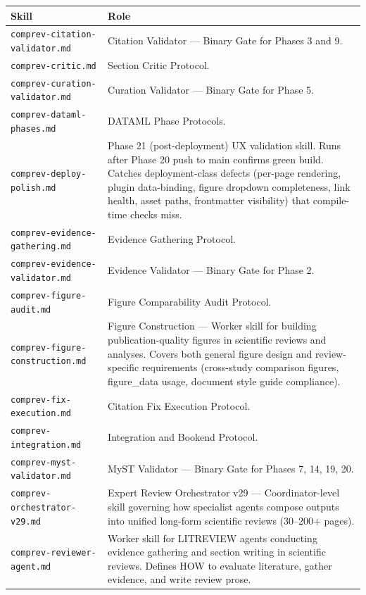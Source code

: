 \documentclass[11pt]{article}
\begin{document}
\begin{table}[H]
\centering
\small
\begin{tabular}{ll}
\toprule
\textbf{Skill} & \textbf{Role} \\
\midrule
\texttt{comprev-citation-validator.md} & Citation Validator --- Binary Gate for Phases 3 and 9. \\
\texttt{comprev-critic.md} & Section Critic Protocol. \\
\texttt{comprev-curation-validator.md} & Curation Validator --- Binary Gate for Phase 5. \\
\texttt{comprev-dataml-phases.md} & DATAML Phase Protocols. \\
\texttt{comprev-deploy-polish.md} & Phase 21 (post-deployment) UX validation skill. Runs after Phase 20 push to main confirms green build. Catches deployment-class defects (per-page rendering, plugin data-binding, figure dropdown completeness, link health, asset paths, frontmatter visibility) that compile-time checks miss. \\
\texttt{comprev-evidence-gathering.md} & Evidence Gathering Protocol. \\
\texttt{comprev-evidence-validator.md} & Evidence Validator --- Binary Gate for Phase 2. \\
\texttt{comprev-figure-audit.md} & Figure Comparability Audit Protocol. \\
\texttt{comprev-figure-construction.md} & Figure Construction --- Worker skill for building publication-quality figures in scientific reviews and analyses. Covers both general figure design and review-specific requirements (cross-study comparison figures, figure\_data usage, document style guide compliance). \\
\texttt{comprev-fix-execution.md} & Citation Fix Execution Protocol. \\
\texttt{comprev-integration.md} & Integration and Bookend Protocol. \\
\texttt{comprev-myst-validator.md} & MyST Validator --- Binary Gate for Phases 7, 14, 19, 20. \\
\texttt{comprev-orchestrator-v29.md} & Expert Review Orchestrator v29 --- Coordinator-level skill governing how specialist agents compose outputs into unified long-form scientific reviews (30--200+ pages). \\
\texttt{comprev-reviewer-agent.md} & Worker skill for LITREVIEW agents conducting evidence gathering and section writing in scientific reviews. Defines HOW to evaluate literature, gather evidence, and write review prose. \\

\end{tabular}
\end{table}
\end{document}

